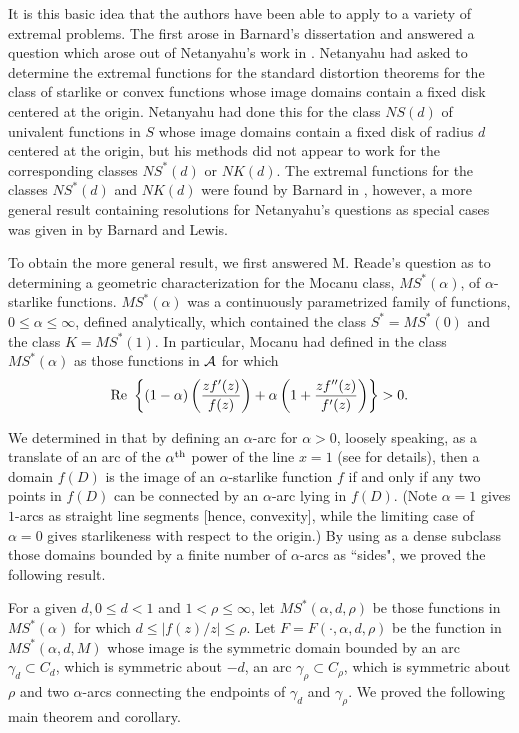 \documentclass[final]{siamltex}
\begin{document}
It is this basic idea that the authors have been able to apply to a variety of extremal problems.  The first 
arose in Barnard's dissertation and answered a question which arose out of Netanyahu's work in \cite{Netanyahu1}.  
Netanyahu had asked to determine the extremal functions for the standard distortion theorems for the class 
of starlike or convex functions whose image domains contain a fixed disk centered at the origin.  Netanyahu 
had done this \cite{Netanyahu1} for the class $NS(d)$ of univalent functions in $S$ whose image domains contain 
a fixed disk of radius $d$ centered at the origin, but his methods did not appear to work for the corresponding 
classes $NS^*(d)$ or $NK(d)$.  The extremal functions for the classes $NS^*(d)$ and $NK(d)$ were found by 
Barnard in \cite{Barnard2}, however, a more general result containing resolutions for Netanyahu's questions 
as special cases was given in \cite{BarnardLewis1} by Barnard and Lewis.

To obtain the more general result, we first answered M. Reade's question as to determining a geometric 
characterization for the Mocanu class, $MS^*(\alpha)$, of $\alpha$-starlike functions.  $MS^*(\alpha)$ 
was a continuously parametrized family of functions, $0 \leq \alpha \leq \infty$, defined analytically, 
which contained the class $S^* = MS^*(0)$ and the class $K = MS^*(1)$.  In particular, Mocanu had defined 
in \cite{Mocanu1} the class $MS^*(\alpha)$ as those functions in ${\cal A}$ for which 
$${\rm Re} \  \left \{ (1-\alpha) \left (\frac{z f'(z)}{f(z)} \right ) + \alpha \left ( 1 + \frac{z f''(z)}{f'(z)} \right ) \right \} > 0.$$

\noindent We determined in \cite{BarnardLewis1} that by defining an $\alpha$-arc for $\alpha > 0$, 
loosely speaking, as a translate of an arc of the $\alpha^{\rm th}$ power of the line $x = 1$ (see \cite{BarnardLewis1} for details), 
then a domain $f(D)$ is the image of an $\alpha$-starlike function $f$ if and only if any two 
points in $f(D)$ can be connected by an $\alpha$-arc lying 
in $f(D)$.  (Note $\alpha = 1$ gives $1$-arcs as straight line segments [hence, convexity], while the limiting case of 
$\alpha=0$ gives starlikeness with respect to the origin.)  By using as a dense subclass those domains 
bounded by a finite number of $\alpha$-arcs as ``sides", we proved the following result.

For a given $d, 0 \leq d < 1$ and $1 < \rho \leq \infty$, let $MS^*(\alpha,d,\rho)$ be those functions in $MS^*(\alpha)$ for 
which $d \leq |f(z)/z| \leq \rho$.  Let $F = F(\cdot,\alpha, d,\rho)$ be the function in $MS^*(\alpha,d,M)$ whose image is the symmetric domain bounded by an arc $\gamma_d \subset C_d$, which is symmetric about $-d$, an arc $\gamma_\rho \subset C_\rho$, which is symmetric about $\rho$ and two $\alpha$-arcs connecting the endpoints of $\gamma_d$ and $\gamma_\rho$. We proved the following main theorem and corollary.
\end{document}
